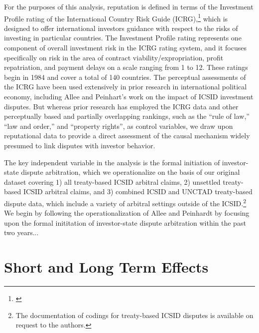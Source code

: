\documentclass[12pt,onesided]{amsart}
\begin{document}

For the purposes of this analysis, reputation is defined in terms of the Investment Profile rating of the International Country Risk Guide (ICRG),\footnote{\citet{prs:2013}} which is designed to offer international investors guidance with respect to the risks of investing in particular countries. The Investment Profile rating represents one component of overall investment risk in the ICRG rating system, and it focuses specifically on risk in the area of contract viability/expropriation, profit repatriation, and payment delays on a scale ranging from 1 to 12. These ratings begin in 1984 and cover a total of 140 countries. The perceptual assessments of the ICRG have been used extensively in prior research in international political economy, including Allee and Peinhart's work on the impact of ICSID investment disputes. But whereas prior research has employed the ICRG data and other perceptually based and partially overlapping rankings, such as the ``rule of law,'' ``law and order,'' and ``property rights'', as control variables, we draw upon reputational data to provide a direct assessment of the causal mechanism widely presumed to link disputes with investor behavior.

The key independent variable in the analysis is the formal initiation of investor-state dispute arbitration, which we operationalize on the basis of our original dataset covering 1) all treaty-based ICSID arbitral claims, 2) unsettled treaty-based ICSID arbitral claims, and 3) combined ICSID and UNCTAD treaty-based dispute data, which include a variety of arbitral settings outside of the ICSID.\footnote{The documentation of codings for treaty-based ICSID disputes is available on request to the authors.} We begin by following the operationalization of Allee and Peinhardt by focusing upon the formal inititation of investor-state dispute arbitration within the past two years...

\section*{Short and Long Term Effects}
\end{document}
